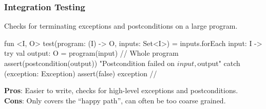 \documentclass{beamer}
\begin{document}
\begin{frame}[fragile]
\frametitle{Integration Testing}
Checks for terminating exceptions and postconditions on a large program.
\begin{kotlinlisting}
fun <I, O> test(program: (I) -> O, inputs: Set<I>) =
  inputs.forEach { input: I ->
    try {
      val output: O = program(input) // Whole program
      assert(postcondition(output)) {
        "Postcondition failed on $input, $output"
      }
    } catch (exception: Exception) {
      assert(false) { exception }  //
    }
  }
\end{kotlinlisting}
\textbf{Pros}: Easier to write, checks for high-level exceptions and postconditions. \\
\textbf{Cons}: Only covers the ``happy path'', can often be too coarse grained.
\end{frame}

\end{document}
